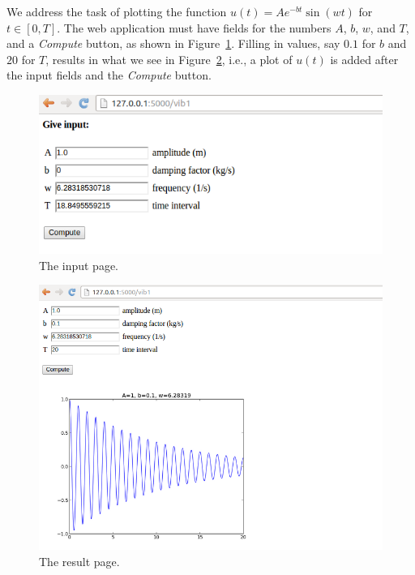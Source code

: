 \documentclass[%
oneside,                 %
final,                   %
10pt]{article}
\begin{document}
{{{{{{{{We address the task of plotting the function $u(t)=Ae^{-bt}\sin (wt)$ for
$t\in [0,T]$. The web application must have fields for the numbers $A$,
$b$, $w$, and $T$, and a \emph{Compute} button, as shown in Figure~\ref{wf:vib1:flask:fig:input}. Filling in values, say $0.1$ for $b$ and
$20$ for $T$, results in what we see in Figure~\ref{wf:vib1:flask:fig:result},
i.e., a plot of $u(t)$ is added after the input fields and the \emph{Compute}
button.


\begin{figure}[ht]
  \centerline{\includegraphics[width=0.9\linewidth]{fig-web4sa/vib1_flask_input.png}}
  \caption{
  The input page. \label{wf:vib1:flask:fig:input}
  }
\end{figure}



\begin{figure}[ht]
  \centerline{\includegraphics[width=0.9\linewidth]{fig-web4sa/vib1_flask_output.png}}
  \caption{
  The result page. \label{wf:vib1:flask:fig:result}
  }
\end{figure}


}}}}}}}}
\end{document}
